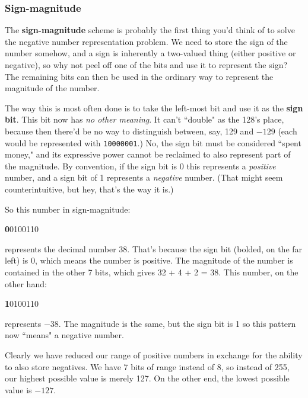 \subsubsection{Sign-magnitude}

The \textbf{sign-magnitude} scheme is probably the first thing you'd think
of to solve the negative number representation problem. We need to store
the sign of the number somehow, and a sign is inherently a two-valued thing
(either positive or negative), so why not peel off one of the bits and use
it to represent the sign? The remaining bits can then be used in the
ordinary way to represent the magnitude of the number.

The way this is most often done is to take the left-most bit and use it as
the \textbf{sign bit}. This bit now has \textit{no other meaning}. It can't
``double" as the 128's place, because then there'd be no way to distinguish
between, say, 129 and $-129$ (each would be represented with
\texttt{10000001}.) No, the sign bit must be considered ``spent money," and
its expressive power cannot be reclaimed to also represent part of the
magnitude. By convention, if the sign bit is 0 this represents a
\textit{positive} number, and a sign bit of 1 represents a
\textit{negative} number. (That might seem counterintuitive, but hey,
that's the way it is.)

So this number in sign-magnitude:
\begin{center}
{\large
\textbf{0}0100110
}
\end{center}
represents the decimal number 38. That's because the sign bit (bolded, on
the far left) is 0, which means the number is positive. The magnitude of
the number is contained in the other 7 bits, which gives 32 + 4 + 2 = 38.
This number, on the other hand:
\begin{center}
{\large
\textbf{1}0100110
}
\end{center}
represents $-38$. The magnitude is the same, but the sign bit is 1 so this
pattern now ``means" a negative number.

Clearly we have reduced our range of positive numbers in exchange for the
ability to also store negatives. We have 7 bits of range instead of 8, so
instead of 255, our highest possible value is merely 127. On the other end,
the lowest possible value is $-127$. 

